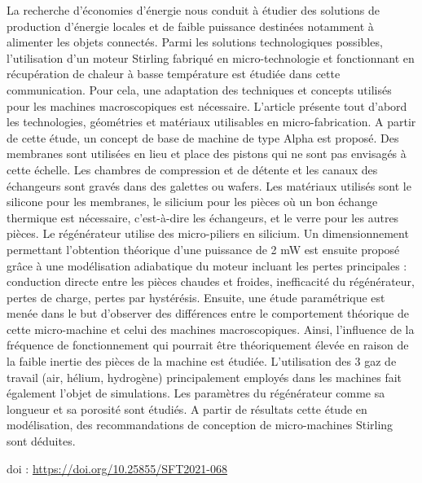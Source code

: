 {\normalsize
La recherche d'économies d'énergie nous conduit à étudier des solutions de production d'énergie locales et de faible puissance destinées notamment à alimenter les objets connectés. Parmi les solutions technologiques possibles, l'utilisation d'un moteur Stirling fabriqué en micro-technologie et fonctionnant en récupération de chaleur à basse température est étudiée dans cette communication. Pour cela, une adaptation des techniques et concepts utilisés pour les machines macroscopiques est nécessaire. L'article présente tout d'abord les technologies, géométries et matériaux utilisables en micro-fabrication. A partir de cette étude, un concept de base de machine de type Alpha est proposé. Des membranes sont utilisées en lieu et place des pistons qui ne sont pas envisagés à cette échelle. Les chambres de compression et de détente et les canaux des échangeurs sont gravés dans des galettes ou wafers.  Les matériaux utilisés sont le silicone pour les membranes, le silicium pour les pièces où un bon échange thermique est nécessaire, c'est-à-dire les échangeurs, et le verre pour les autres pièces.  Le régénérateur utilise des micro-piliers en silicium. Un dimensionnement permettant l'obtention théorique d'une puissance de 2 mW est ensuite proposé grâce à une modélisation adiabatique du moteur incluant les pertes principales : conduction directe entre les pièces chaudes et froides, inefficacité du régénérateur, pertes de charge, pertes par hystérésis. Ensuite, une étude paramétrique est menée dans le but d'observer des différences entre le comportement théorique de cette micro-machine et celui des machines macroscopiques. Ainsi, l'influence de la fréquence de fonctionnement qui pourrait être théoriquement élevée en raison de la faible inertie des pièces de la machine est étudiée. L'utilisation des 3 gaz de travail (air, hélium, hydrogène) principalement employés dans les machines fait également l'objet de simulations. Les paramètres du régénérateur comme sa longueur et sa porosité sont étudiés. A partir de résultats cette étude en modélisation, des recommandations de conception de micro-machines Stirling sont déduites.

 \vfill doi : \url{https://doi.org/10.25855/SFT2021-068}

}
 
